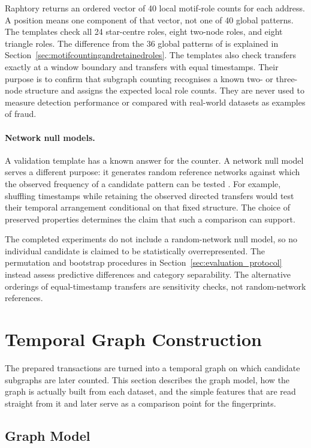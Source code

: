 \documentclass{thesisclass}
\begin{document}
Raphtory returns an ordered vector of 40 local motif-role counts for each
address. A position means one component of that vector, not one of 40 global
patterns. The templates check all 24 star-centre roles, eight two-node roles,
and eight triangle roles. The difference from the 36 global patterns of
\citet{paranjape2017motifs} is explained in
Section~\ref{sec:motifcountingandretainedroles}. The templates also check
transfers exactly at a window boundary and transfers with equal timestamps.
Their purpose is to confirm that subgraph counting recognises a known two- or
three-node structure and assigns the expected local role counts. They are
never used to measure detection performance or compared with real-world
datasets as examples of fraud.

\paragraph{Network null models.}
A validation template has a known answer for the counter. A network null model
serves a different purpose: it generates random reference networks against which
the observed frequency of a candidate pattern can be tested
\citep{milo2002network}. For example, shuffling timestamps while retaining the
observed directed transfers would test their temporal arrangement conditional
on that fixed structure. The choice of preserved properties determines the
claim that such a comparison can support.

The completed experiments do not include a random-network null model, so no
individual candidate is claimed to be statistically overrepresented. The
permutation and bootstrap procedures in
Section~\ref{sec:evaluation_protocol} instead assess predictive differences and
category separability. The alternative orderings of equal-timestamp transfers
are sensitivity checks, not random-network references.

\section{Temporal Graph Construction}
\label{sec:graph_construction}

The prepared transactions are turned into a temporal graph on which candidate
subgraphs are later counted. This section describes the graph model, how the
graph is actually built from each dataset, and the simple features that are read
straight from it and later serve as a comparison point for the fingerprints.

\subsection{Graph Model}
\end{document}
